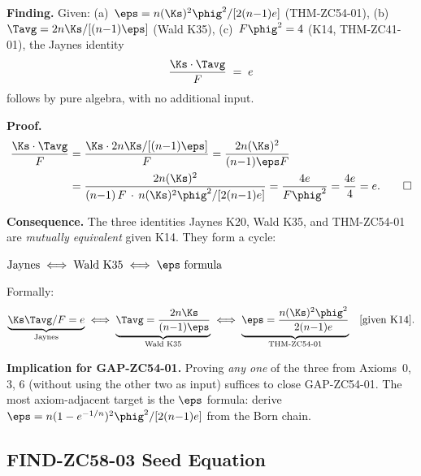 \documentclass[12pt, a4paper]{article}
\begin{document}
\begin{derivedbox}[title={FIND-ZC58-02: Algebraic Tautology ---
  Jaynes Follows from $\eps$ Formula + Wald + K14 ($R_0$, Exact)}]
\textbf{Finding.}
Given:
(a)~$\eps=n(\Ks)^2\phig^2/[2(n{-}1)e]$ (THM-ZC54-01),
(b)~$\Tavg=2n\Ks/[(n{-}1)\eps]$ (Wald K35),
(c)~$F\phig^2=4$ (K14, THM-ZC41-01),
the Jaynes identity
\begin{equation}
  \frac{\Ks\cdot\Tavg}{F} \;=\; e
  \label{eq:jaynes}
\end{equation}
follows by pure algebra, with no additional input.

\textbf{Proof.}
\begin{align*}
  \frac{\Ks\cdot\Tavg}{F}
  &= \frac{\Ks \cdot 2n\Ks/[(n{-}1)\eps]}{F}
  = \frac{2n(\Ks)^2}{(n{-}1)\eps F} \\
  &= \frac{2n(\Ks)^2}%
    {(n{-}1)\,F\,\cdot\,n(\Ks)^2\phig^2/[2(n{-}1)e]}
  = \frac{4e}{F\phig^2}
  = \frac{4e}{4} = e.\qquad\square
\end{align*}

\textbf{Consequence.}
The three identities Jaynes K20, Wald K35, and THM-ZC54-01 are
\emph{mutually equivalent} given K14.  They form a cycle:
\begin{center}
$\text{Jaynes}\;\Longleftrightarrow\;\text{Wald K35}\;\Longleftrightarrow\;\eps\text{ formula}$
\quad{}
\end{center}
Formally:
\[
  \underbrace{\Ks\Tavg/F=e}_{\text{Jaynes}}
  \;\Longleftrightarrow\;
  \underbrace{\Tavg=\frac{2n\Ks}{(n{-}1)\eps}}_{\text{Wald K35}}
  \;\Longleftrightarrow\;
  \underbrace{\eps=\frac{n({\Ks})^2\phig^2}{2(n{-}1)e}}_{\text{THM-ZC54-01}}
  \quad[\text{given K14}].
\]

\textbf{Implication for GAP-ZC54-01.}
Proving \emph{any one} of the three from Axioms~0, 3, 6
(without using the other two as input) suffices to close
GAP-ZC54-01.  The most axiom-adjacent target is the $\eps$
formula: derive $\eps=n(1-e^{-1/n})^2\phig^2/[2(n{-}1)e]$
from the Born chain.
\end{derivedbox}

\subsection{FIND-ZC58-03 \quad Seed Equation}
\label{sec:find03}

\end{document}
